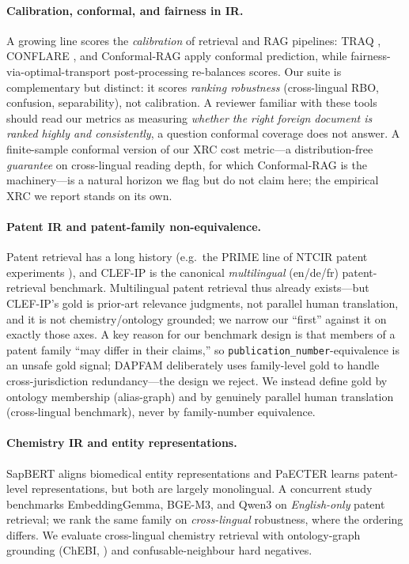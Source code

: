 \documentclass[11pt]{article}
\begin{document}
\paragraph{Calibration, conformal, and fairness in IR.}
A growing line scores the \emph{calibration} of retrieval and RAG pipelines:
TRAQ \citep{traq2023}, CONFLARE \citep{conflare2024}, and Conformal-RAG
\citep{conformalrag2025} apply conformal prediction, while
fairness-via-optimal-transport post-processing
\citep{fairnessot2023,buyl2022optimal} re-balances scores. Our suite is
complementary but distinct: it scores \emph{ranking robustness} (cross-lingual
RBO, confusion, separability), not calibration. A reviewer familiar with these
tools should read our metrics as measuring \emph{whether the right foreign
document is ranked highly and consistently}, a question conformal coverage does
not answer. A finite-sample conformal version of our XRC cost metric---a
distribution-free \emph{guarantee} on cross-lingual reading depth, for which
Conformal-RAG \citep{conformalrag2025} is the machinery---is a natural horizon
we flag but do not claim here; the empirical XRC we report stands on its own.

\paragraph{Patent IR and patent-family non-equivalence.}
Patent retrieval has a long history (e.g.\ the PRIME line of NTCIR patent
experiments \citep{prime2002}), and CLEF-IP \citep{clefip2013} is the canonical
\emph{multilingual} (en/de/fr) patent-retrieval benchmark. Multilingual patent
retrieval thus already exists---but CLEF-IP's gold is prior-art relevance
judgments, not parallel human translation, and it is not chemistry/ontology
grounded; we narrow our ``first'' against it on exactly those axes. A key reason
for our benchmark design is that members of a patent family ``may differ in
their claims,'' so \texttt{publication\_number}-equivalence is an unsafe gold
signal; DAPFAM \citep{dapfam2025} deliberately uses family-level gold to handle
cross-jurisdiction redundancy---the design we reject. We instead define gold by
ontology membership (alias-graph) and by genuinely parallel human translation
(cross-lingual benchmark), never by family-number equivalence.

\paragraph{Chemistry IR and entity representations.}
SapBERT \citep{sapbert2021} aligns biomedical entity representations and PaECTER
\citep{paecter2024} learns patent-level representations, but both are largely
monolingual. A concurrent study \citep{patentembeddings2026} benchmarks
EmbeddingGemma, BGE-M3, and Qwen3 on \emph{English-only} patent retrieval; we
rank the same family on \emph{cross-lingual} robustness, where the ordering
differs. We evaluate cross-lingual chemistry retrieval with ontology-graph
grounding (ChEBI, \citealp{chebi2016}) and confusable-neighbour hard negatives.
\end{document}
